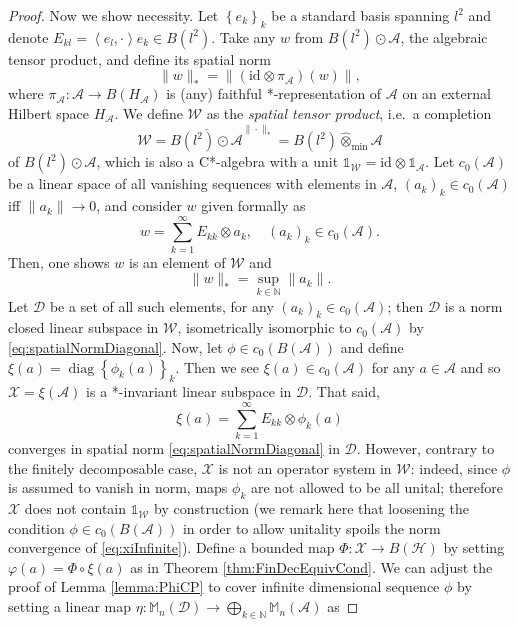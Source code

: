 \documentclass[reqno]{amsart}
\theoremstyle{plain}
\numberwithin{equation}{section}
\numberwithin{theorem}{section}
\numberwithin{lemma}{section}
\numberwithin{definition}{section}
\numberwithin{corollary}{section}
\numberwithin{remark}{section}
\newcommand{\naturals}{\mathbb{N}}
\newcommand{\id}[1]{\mathrm{id}_{#1}}
\newcommand{\iprod}[2]{\left\langle #1, #2 \right\rangle}
\newcommand{\hilbert}{\mathcal{H}}
\newcommand{\matra}[2]{\mathbb{M}_{#1}(#2)}
\newcommand{\unit}{\mathds{1}}
\begin{document}
\begin{proof}
    Now we show necessity. Let $\left\{e_k\right\}_k$ be a standard basis spanning $l^2$ and denote $E_{kl} = \iprod{e_l}{\cdot}e_k \in B(l^2)$. Take any $w$ from $B(l^2)\odot\mathscr{A}$, the algebraic tensor product, and define its spatial norm
    \begin{equation}
        \|w\|_* = \| \left(\id{}\otimes\pi_\mathscr{A}\right)(w) \| ,
    \end{equation}
    where $\pi_\mathscr{A} : \mathscr{A}\to B(H_\mathscr{A})$ is (any) faithful *-representation of $\mathscr{A}$ on an external Hilbert space $H_\mathscr{A}$. We define $\mathscr{W}$ as the \emph{spatial tensor product}, i.e.~a completion
    \begin{equation}\label{eq:WdefinitionSpatial}
        \mathscr{W} = \overline{B(l^2)\odot\mathscr{A}}^{\|\cdot\|_*} = B(l^2) \hat{\otimes}_\mathrm{min} \mathscr{A}
    \end{equation}
    of $B(l^2)\odot\mathscr{A}$, which is also a C*-algebra with a unit $\unit_\mathscr{W} = \id{}\otimes\unit_\mathscr{A}$. Let $c_0 (\mathscr{A})$ be a linear space of all vanishing sequences with elements in $\mathscr{A}$, $\left(a_k\right)_k \in c_0 (\mathscr{A})$ iff $\|a_k\|\to 0$, and consider $w$ given formally as
    \begin{equation}
        w = \sum_{k=1}^{\infty} E_{kk} \otimes a_k, \quad \left(a_k\right)_k \in c_0 (\mathscr{A}).
    \end{equation}
    Then, one shows $w$ is an element of $\mathscr{W}$ and
    \begin{equation}\label{eq:spatialNormDiagonal}
        \|w\|_* = \sup_{k\in\naturals}\|a_k\|.
    \end{equation} 
    Let $\mathscr{D}$ be a set of all such elements, for any $\left(a_k\right)_k \in c_0 (\mathscr{A})$; then $\mathscr{D}$ is a norm closed linear subspace in $\mathscr{W}$, isometrically isomorphic to $c_0 (\mathscr{A})$ by \eqref{eq:spatialNormDiagonal}. Now, let $\phi \in c_0 (B(\mathscr{A}))$ and define $\xi(a) = \operatorname{diag}{\left\{\phi_k (a)\right\}_{k}}$. Then we see $\xi(a) \in c_0(\mathscr{A})$ for any $a\in\mathscr{A}$ and so $\mathscr{X} =\xi(\mathscr{A})$ is a *-invariant linear subspace in $\mathscr{D}$. That said,
    \begin{equation}\label{eq:xiInfinite}
        \xi(a) = \sum_{k=1}^{\infty}E_{kk}\otimes\phi_k (a)
    \end{equation}
    converges in spatial norm \eqref{eq:spatialNormDiagonal} in $\mathscr{D}$. However, contrary to the finitely decomposable case, $\mathscr{X}$ is not an operator system in $\mathscr{W}$: indeed, since $\phi$ is assumed to vanish in norm, maps $\phi_k$ are not allowed to be all unital; therefore $\mathscr{X}$ does not contain $\unit_\mathscr{W}$ by construction (we remark here that loosening the condition $\phi\in c_0(B(\mathscr{A}))$ in order to allow unitality spoils the norm convergence of \eqref{eq:xiInfinite}). Define a bounded map $\Phi : \mathscr{X}\to B(\hilbert)$ by setting $\varphi (a) = \Phi\circ\xi(a)$ as in Theorem \ref{thm:FinDecEquivCond}. We can adjust the proof of Lemma \ref{lemma:PhiCP} to cover infinite dimensional sequence $\phi$ by setting a linear map $\eta : \matra{n}{\mathscr{D}}\to\bigoplus_{k\in\naturals}\matra{n}{\mathscr{A}}$ as

\end{proof}
\end{document}
